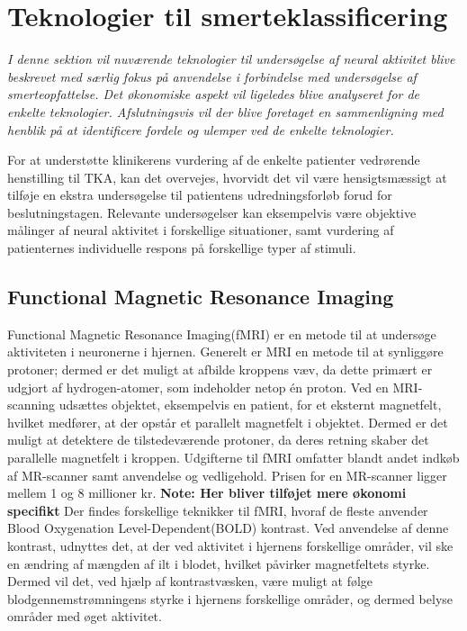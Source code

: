 \section{Teknologier til smerteklassificering} %
\textit{I denne sektion vil nuværende teknologier til undersøgelse af neural aktivitet blive beskrevet med særlig fokus på anvendelse i forbindelse med undersøgelse af smerteopfattelse. Det økonomiske aspekt vil ligeledes blive analyseret for de enkelte teknologier. Afslutningsvis vil der blive foretaget en sammenligning med henblik på at identificere fordele og ulemper ved de enkelte teknologier.}

For at understøtte klinikerens vurdering af de enkelte patienter vedrørende henstilling til TKA, kan det overvejes, hvorvidt det vil være hensigtsmæssigt at tilføje en ekstra undersøgelse til patientens udredningsforløb forud for beslutningstagen. Relevante undersøgelser kan eksempelvis være objektive målinger af neural aktivitet i forskellige situationer, samt vurdering af patienternes individuelle respons på forskellige typer af stimuli. 


\subsection{Functional Magnetic Resonance Imaging}
Functional Magnetic Resonance Imaging(fMRI) er en metode til at undersøge aktiviteten i neuronerne i hjernen.
Generelt er MRI en metode til at synliggøre protoner; dermed er det muligt at afbilde kroppens væv, da dette primært er udgjort af hydrogen-atomer, som indeholder netop én proton.     
Ved en MRI-scanning udsættes objektet, eksempelvis en patient, for et eksternt magnetfelt, hvilket medfører, at der opstår et parallelt magnetfelt i objektet. Dermed er det muligt at detektere de tilstedeværende protoner, da deres retning skaber det parallelle magnetfelt i kroppen. \citep{Wals2009} Udgifterne til fMRI omfatter blandt andet indkøb af MR-scanner samt anvendelse og vedligehold. Prisen for en MR-scanner ligger mellem 1 og 8 millioner kr. \citep{Glover2014} \textbf{Note: Her bliver tilføjet mere økonomi specifikt} 
Der findes forskellige teknikker til fMRI, hvoraf de fleste anvender Blood Oxygenation Level-Dependent(BOLD) kontrast. Ved anvendelse af denne kontrast, udnyttes det, at der ved aktivitet i hjernens forskellige områder, vil ske en ændring af mængden af ilt i blodet, hvilket påvirker magnetfeltets styrke. Dermed vil det, ved hjælp af kontrastvæsken, være muligt at følge blodgennemstrømningens styrke i hjernens forskellige områder, og dermed belyse områder med øget aktivitet. \citep{Wals2009} 

